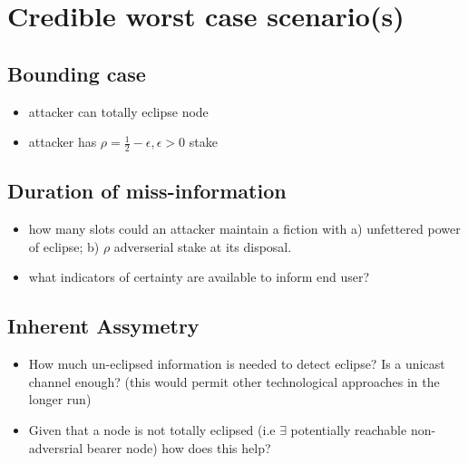 \documentclass{article}
\theoremstyle{definition}{
  \newtheorem{lemma}{Lemma}[section] %
  \newtheorem{definition}[lemma]{Definition}
}
\theoremstyle{theorem}{
  \newtheorem{invariant}[lemma]{Invariant}
  \newtheorem{proofobligation}[lemma]{Proof Obligation}
}
\numberwithin{equation}{lemma}
\begin{document}



\appendix
\section{Credible worst case scenario(s)}
\subsection{Bounding case}
\begin{itemize}
\item attacker can totally eclipse node
\item attacker has  $\rho = \frac{1}{2} - \epsilon, \epsilon > 0$ stake
\end{itemize}
\subsection{Duration of miss-information}
\begin{itemize}
\item how many slots could an attacker maintain a fiction with a)
  unfettered power of eclipse; b) $\rho$ adverserial stake at its disposal.
\item what indicators of certainty are available to inform end user?
\end{itemize}
\subsection{Inherent Assymetry}
\begin{itemize}
\item How much un-eclipsed information is needed to detect eclipse? Is
  a unicast channel enough? (this would permit other technological
  approaches in the longer run)
\item Given that a node is not totally eclipsed (i.e $\exists$
  potentially reachable non-adversrial bearer node) how does this help?
\end{itemize}  
\end{document}
